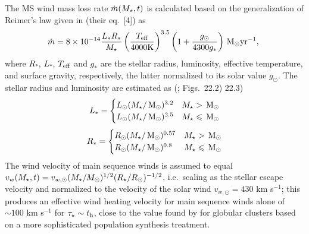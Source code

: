 The MS wind mass loss rate $\dot{m}(M_{\star}, t)$ is calculated based on the generalization of Reimer's law given in \citet{SchroderCuntz:2005a} (their eq.~[4]) as
\begin{align}
  \dot{m}=8 \times 10^{-14} \frac{L_* R_*}{M_{\star}}
  \left(\frac{T_{\rm eff}}{\rm 4000 K}\right)^{3.5}
  \left(1+\frac{g_{\odot}}{4300 g_*}\right) \,{\rm M_\odot} {\rm yr}^{-1},\
\end{align}
where  $R_*$, $L_*$, $T_{\rm eff}$ and $g_*$ are the stellar radius,
luminosity, effective temperature, and surface gravity, respectively, the latter normalized to its solar value $g_{\odot}$.  The stellar radius and luminosity are estimated as (\citet{Kippenhahn&Weigert90}; Figs.~22.2) 22.3)
\begin{align}
L_*=
\begin{cases}
L_{\odot} (M_{\star}/\,{\rm M_\odot})^{3.2} & M_{\star} > \,{\rm M_\odot} \\
L_{\odot} (M_{\star}/\,{\rm M_\odot})^{2.5} & M_{\star} \leqslant \,{\rm M_\odot}
\end{cases}
\end{align}
\begin{align}
R_*=
\begin{cases}
R_{\odot} (M_{\star}/\,{\rm M_\odot})^{0.57} & M_{\star} > \,{\rm M_\odot} \\
R_{\odot} (M_{\star}/\,{\rm M_\odot})^{0.8} & M_{\star} \leqslant \,{\rm M_\odot}
\end{cases}
\end{align}
The wind velocity of main sequence winds is assumed
to equal $v_w (M_{\star}, t) = v_{w,\odot}(M_{\star}/M_{\odot})^{1/2}(R_{\star}/R_{\odot})^{-1/2}$, i.e.~scaling as the stellar escape velocity and normalized to the velocity of the solar wind $v_{w,\odot} = 430$ km s$^{-1}$; this produces an effective wind heating velocity for main
sequence winds alone of $\sim 100$ km s$^{-1}$ for $\tau_{\star} \sim t_{\rm h}$, close to the value found by \citet{NaimanSoares-Furtado+:2013a} for globular clusters based on a more
sophisticated population synthesis treatment. 

